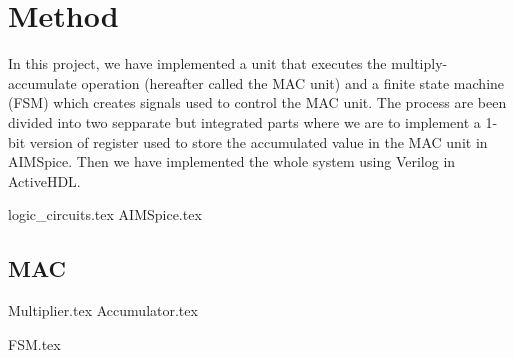 \section{Method}
In this project, we have implemented a unit that executes the multiply-accumulate
operation (hereafter called the MAC unit) and a finite state machine (FSM) which creates
signals used to control the MAC unit. The process are been divided into two sepparate but integrated parts where we are to implement a 1-bit version of register used to store the accumulated value in the MAC unit in AIMSpice. Then we have implemented the whole system using Verilog in ActiveHDL.



{logic_circuits.tex}
{AIMSpice.tex}
\subsection{MAC} 
{Multiplier.tex}
{Accumulator.tex}


{FSM.tex}